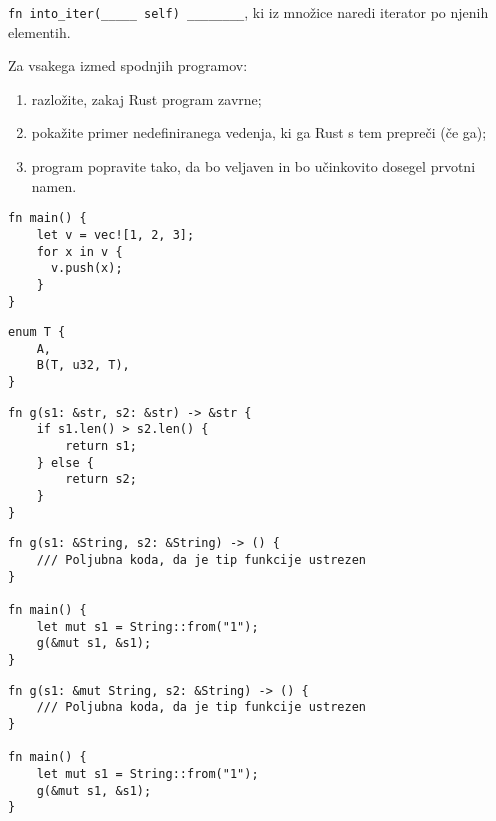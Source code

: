 \documentclass[arhiv]{izpit}
\begin{document}
\podnaloga
\texttt{fn into_iter(_____ self) ________}, ki iz množice naredi iterator po njenih elementih.



\naloga[\tocke{30}]

Za vsakega izmed spodnjih programov:
\begin{enumerate}
  \item razložite, zakaj Rust program zavrne;
  \item pokažite primer nedefiniranega vedenja, ki ga Rust s tem prepreči (če ga);
  \item program popravite tako, da bo veljaven in bo učinkovito dosegel prvotni namen.
\end{enumerate}

\podnaloga
\begin{verbatim}
fn main() {
    let v = vec![1, 2, 3];
    for x in v {
      v.push(x);
    }
}
\end{verbatim}

\podnaloga
\begin{verbatim}
enum T {
    A,
    B(T, u32, T),
}
\end{verbatim}

\podnaloga
\begin{verbatim}
fn g(s1: &str, s2: &str) -> &str {
    if s1.len() > s2.len() {
        return s1;
    } else {
        return s2;
    }
}
\end{verbatim}

\podnaloga

\begin{verbatim}
fn g(s1: &String, s2: &String) -> () {
    /// Poljubna koda, da je tip funkcije ustrezen
}

fn main() {
    let mut s1 = String::from("1");
    g(&mut s1, &s1);
}
\end{verbatim}

\podnaloga

\begin{verbatim}
fn g(s1: &mut String, s2: &String) -> () {
    /// Poljubna koda, da je tip funkcije ustrezen
}

fn main() {
    let mut s1 = String::from("1");
    g(&mut s1, &s1);
}
\end{verbatim}
\end{document}
